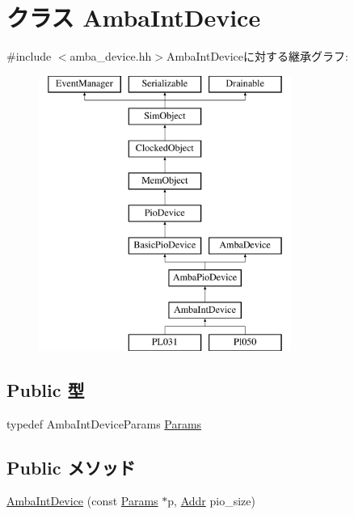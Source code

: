 \hypertarget{classAmbaIntDevice}{
\section{クラス AmbaIntDevice}
\label{classAmbaIntDevice}
}


{\ttfamily \#include $<$amba\_\-device.hh$>$}AmbaIntDeviceに対する継承グラフ:\begin{figure}[H]
\begin{center}
\leavevmode
\includegraphics[height=9cm]{classAmbaIntDevice}
\end{center}
\end{figure}
\subsection*{Public 型}
\begin{DoxyCompactItemize}
\item 
typedef AmbaIntDeviceParams \hyperlink{classAmbaIntDevice_aa70660260d212b343768d91a298c80de}{Params}
\end{DoxyCompactItemize}
\subsection*{Public メソッド}
\begin{DoxyCompactItemize}
\item 
\hyperlink{classAmbaIntDevice_adef94b04b9c62ec3a1f26f4d201cbaf5}{AmbaIntDevice} (const \hyperlink{classAmbaIntDevice_aa70660260d212b343768d91a298c80de}{Params} $\ast$p, \hyperlink{base_2types_8hh_af1bb03d6a4ee096394a6749f0a169232}{Addr} pio\_\-size)
\end{DoxyCompactItemize}
